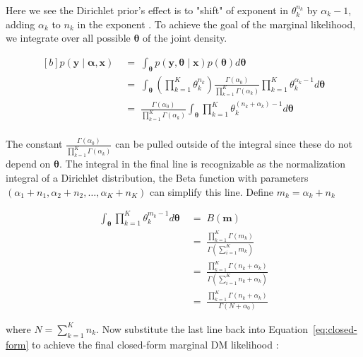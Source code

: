 Here we see the Dirichlet prior's effect is to "shift" of exponent in \(\theta_k^{n_k}\) by \(\alpha_k-1\), adding \(\alpha_k\) to \(n_k\) in the exponent \citep{mimno_polya}. To achieve the goal of the marginal likelihood, we integrate over all possible \(\boldsymbol{\theta}\) of the joint density.

\begin{equation}
    \label{eq:closed-form}
    \begin{aligned}[b]
        p(\mathbf{y} \mid \boldsymbol{\alpha}, \mathbf{x}) 
    \;&=\;
        \int_{\boldsymbol{\theta}} p(\mathbf{y}, \boldsymbol{\theta} \mid \mathbf{x})
        p(\boldsymbol{\theta})
        d\boldsymbol{\theta}\\
    \;&=\;
        \int_{\boldsymbol{\theta}} 
        \left( \prod_{k=1}^K \theta_k^{n_k}\right)
        \frac{\Gamma(\alpha_0)}{\prod_{k=1}^K \Gamma(\alpha_k)} \prod_{k=1}^K \theta_k^{\alpha_k-1} d\boldsymbol{\theta}\\
    \;&=\;
        \frac{\Gamma(\alpha_0)}{\prod_{k=1}^K \Gamma(\alpha_k)} 
        \int_{\boldsymbol{\theta}} \prod_{k=1}^K \theta_k^{(n_k + \alpha_k) -1} d\boldsymbol{\theta}\\
    \end{aligned}   
\end{equation}

The constant \(\frac{\Gamma(\alpha_0)}{\prod_{k=1}^K \Gamma(\alpha_k)}\) can be pulled outside of the integral since these do not depend on \(\boldsymbol{\theta}\). The integral in the final line is recognizable as the normalization integral of a Dirichlet distribution, the Beta function with parameters \((\alpha_1 + n_1, \alpha_2 + n_2, \dots, \alpha_K + n_K)\) can simplify this line. Define \(m_k = \alpha_k + n_k\)

\begin{align*}
        \int_{\boldsymbol{\theta}} \prod_{k=1}^K \theta_k^{m_k - 1} d\boldsymbol{\theta}
    \;&=\;
        B(\mathbf{m})\\
    \;&=\;
        \frac{\prod_{k=1}^K \Gamma(m_k)}{\Gamma(\sum_{i=1}^K m_k)}\\
    \;&=\;
        \frac{\prod_{k=1}^K \Gamma(n_k + \alpha_k)}{\Gamma(\sum_{i=1}^K n_k + \alpha_k )} \\
    \;&=\;
        \frac{\prod_{k=1}^K \Gamma(n_k + \alpha_k)}{\Gamma(N + \alpha_0)} 
\end{align*}

where \(N = \sum_{k=1}^K n_k\). Now substitute the last line back into Equation~\ref{eq:closed-form} to achieve the final closed-form marginal DM likelihood \citep{wiki:dirichlet-multinomial}:

